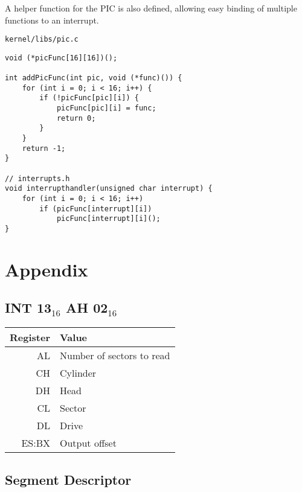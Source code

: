 \documentclass{article}
\begin{document}
A helper function for the PIC is also defined, allowing
easy binding of multiple functions to an interrupt.

\begin{verbatim}
kernel/libs/pic.c
\end{verbatim}
\begin{verbatim}
void (*picFunc[16][16])();

int addPicFunc(int pic, void (*func)()) {
	for (int i = 0; i < 16; i++) {
		if (!picFunc[pic][i]) {
			picFunc[pic][i] = func;
			return 0;
		}
	}
	return -1;
}

// interrupts.h
void interrupthandler(unsigned char interrupt) {
	for (int i = 0; i < 16; i++)
		if (picFunc[interrupt][i])
			picFunc[interrupt][i]();
}
\end{verbatim}

\newpage

\section{Appendix}
\appendix

\subsection{INT 13$_{16}$ AH 02$_{16}$}
\label{int 13 ah 02}

\begin{tabular}{|r|l|}
	\hline
	\textbf{Register} & \textbf{Value} \\
	\hline
	AL & Number of sectors to read \\
	\hline
	CH & Cylinder \\
	\hline
	DH & Head \\
	\hline
	CL & Sector \\
	\hline
	DL & Drive \\
	\hline
	ES:BX & Output offset \\
	\hline
\end{tabular}

\subsection{Segment Descriptor}
\label{gdt}
\end{document}

